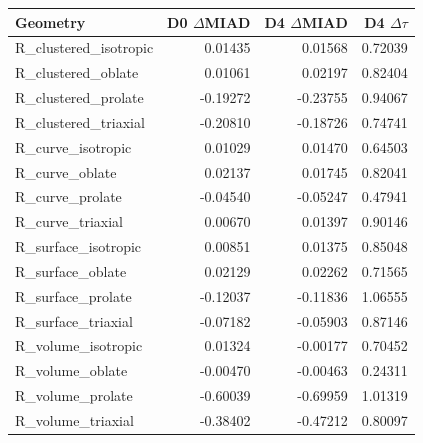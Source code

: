 \begin{tabular}{lrrr}
Geometry & D0 $\Delta$MIAD & D4 $\Delta$MIAD & D4 $\Delta\tau$ \\
\hline
R\_clustered\_isotropic & 0.01435 & 0.01568 & 0.72039 \\
R\_clustered\_oblate & 0.01061 & 0.02197 & 0.82404 \\
R\_clustered\_prolate & -0.19272 & -0.23755 & 0.94067 \\
R\_clustered\_triaxial & -0.20810 & -0.18726 & 0.74741 \\
R\_curve\_isotropic & 0.01029 & 0.01470 & 0.64503 \\
R\_curve\_oblate & 0.02137 & 0.01745 & 0.82041 \\
R\_curve\_prolate & -0.04540 & -0.05247 & 0.47941 \\
R\_curve\_triaxial & 0.00670 & 0.01397 & 0.90146 \\
R\_surface\_isotropic & 0.00851 & 0.01375 & 0.85048 \\
R\_surface\_oblate & 0.02129 & 0.02262 & 0.71565 \\
R\_surface\_prolate & -0.12037 & -0.11836 & 1.06555 \\
R\_surface\_triaxial & -0.07182 & -0.05903 & 0.87146 \\
R\_volume\_isotropic & 0.01324 & -0.00177 & 0.70452 \\
R\_volume\_oblate & -0.00470 & -0.00463 & 0.24311 \\
R\_volume\_prolate & -0.60039 & -0.69959 & 1.01319 \\
R\_volume\_triaxial & -0.38402 & -0.47212 & 0.80097 \\
\end{tabular}
